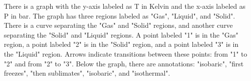 There is a graph with the y-axis labeled as T in Kelvin and the x-axis labeled as P in bar. The graph has three regions labeled as "Gas", "Liquid", and "Solid". There is a curve separating the "Gas" and "Solid" regions, and another curve separating the "Solid" and "Liquid" regions. A point labeled "1" is in the "Gas" region, a point labeled "2" is in the "Solid" region, and a point labeled "3" is in the "Liquid" region. Arrows indicate transitions between these points: from "1" to "2" and from "2" to "3". Below the graph, there are annotations: "isobaric", "first freezes", "then sublimates", "isobaric", and "isothermal".